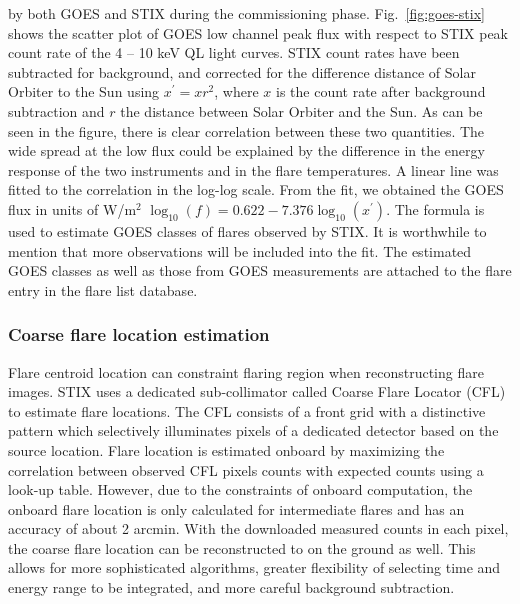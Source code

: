 \documentclass{aa}
\begin{document}
by both GOES  and   STIX during the commissioning phase.   
Fig.~\ref{fig:goes-stix} shows the scatter plot of GOES low channel peak flux with respect to 
STIX peak count rate  of the 4 -- 10 keV QL light curves. 
STIX count rates  have been subtracted for background,  and corrected for 
the difference distance of Solar Orbiter to the Sun using $x^{'}=x r^2$, where $x$ is the count rate after background subtraction
 and $r$ the distance between Solar Orbiter and the Sun. 
As can be seen in the figure, there is clear correlation between
these two quantities.  The wide spread at the low flux could be explained by the difference in 
the energy response of the two instruments and in the flare temperatures. 
A linear line was fitted to the  correlation in the log-log scale. 
From the fit, we obtained 
the GOES flux in units of W/m$^2$ $\log_{10}(f) = 0.622 -7.376 \log_{10} (x^{'})$.
The formula is used to estimate  GOES classes  of flares observed by STIX. 
It is worthwhile to mention that more observations will be included into the fit.
The estimated GOES classes as well as those from GOES measurements 
are attached to  the flare entry in the flare list database. 


\subsubsection{Coarse flare location estimation}
Flare centroid location can constraint flaring region when reconstructing flare images.
STIX uses a dedicated sub-collimator called Coarse Flare Locator (CFL) to estimate flare locations.
The CFL consists of a front grid with
a distinctive pattern which selectively illuminates pixels of a 
dedicated detector based on the source location.
Flare location is estimated onboard by maximizing the correlation between observed CFL pixels counts 
with expected counts using a look-up table. 
However, due to the constraints of onboard computation, the onboard flare location is  only calculated for intermediate flares 
and has an accuracy of about 2 arcmin. 
With the downloaded measured counts  in each pixel,
the coarse flare location can be reconstructed to on the ground as well. 
This allows for more sophisticated algorithms, greater flexibility of selecting time and energy 
range to be integrated, and more careful background subtraction.
\end{document}
